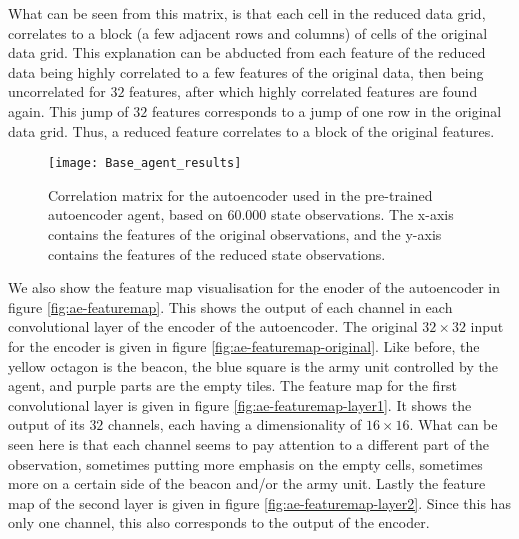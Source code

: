 What can be seen from this matrix, is that each cell in the reduced data grid, correlates to a block (a few adjacent rows and columns) of cells of the original data grid. This explanation can be abducted from each feature of the reduced data being highly correlated to a few features of the original data, then being uncorrelated for $32$ features, after which highly correlated features are found again. This jump of $32$ features corresponds to a jump of one row in the original data grid. Thus, a reduced feature correlates to a block of the original features.

\begin{figure}[h]
	\centering
	\texttt{[image: Base\_agent\_results]}
	\caption{Correlation matrix for the autoencoder used in the pre-trained autoencoder agent, based on $60.000$ state observations. The x-axis contains the features of the original observations, and the y-axis contains the features of the reduced state observations.}
	\label{fig:ae-corr}
\end{figure}

We also show the feature map visualisation for the enoder of the autoencoder in figure \ref{fig:ae-featuremap}. This shows the output of each channel in each convolutional layer of the encoder of the autoencoder. The original $32 \times 32$ input for the encoder is given in figure \ref{fig:ae-featuremap-original}. Like before, the yellow octagon is the beacon, the blue square is the army unit controlled by the agent, and purple parts are the empty tiles. The feature map for the first convolutional layer is given in figure \ref{fig:ae-featuremap-layer1}. It shows the output of its $32$ channels, each having a dimensionality of $16 \times 16$. What can be seen here is that each channel seems to pay attention to a different part of the observation, sometimes putting more emphasis on the empty cells, sometimes more on a certain side of the beacon and/or the army unit. Lastly the feature map of the second layer is given in figure \ref{fig:ae-featuremap-layer2}. Since this has only one channel, this also corresponds to the output of the encoder. 


